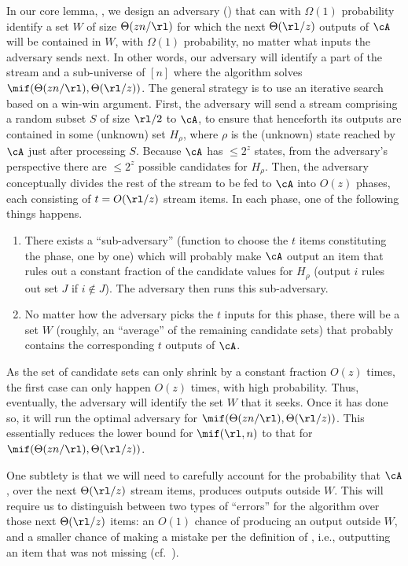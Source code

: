 \begin{itemize}
\begin{itemize}
In our core lemma, , we design an adversary
() that can with $\Omega(1)$ probability identify
a set $W$ of size $\Theta(z n /\rl)$ for which the next $\Theta(\rl/z)$
outputs of $\cA$ will be contained in $W$, with $\Omega(1)$ probability, no
matter what inputs the adversary sends next. In other words, our adversary
will identify a part of the stream and a sub-universe of $[n]$ where the
algorithm solves $\mif(\Theta(z n /\rl), \Theta(\rl/z))$. The general strategy
is to use an iterative search based on a win-win argument.  First, the
adversary will send a stream comprising a random subset $S$ of size $\rl/2$ to
$\cA$, to ensure that henceforth its outputs are contained in some (unknown)
set $H_\rho$, where $\rho$ is the (unknown) state reached by $\cA$ just after
processing $S$.  Because $\cA$ has $\le 2^z$ states, from the adversary's
perspective there are $\le 2^z$ possible candidates for $H_\rho$. Then, the
adversary conceptually divides the rest of the stream to be fed to $\cA$ into
$O(z)$ phases, each consisting of $t = O(\rl/z)$ stream items. In each phase,
one of the following things happens.
%
\begin{enumerate}
%
\item There exists a ``sub-adversary'' (function to choose the $t$ items
constituting the phase, one by one) which will probably make $\cA$ output an
item that rules out a constant fraction of the candidate values for $H_\rho$
(output $i$ rules out set $J$ if $i \notin J$). The adversary then runs this
sub-adversary.
%
\item No matter how the adversary picks the $t$ inputs for this phase, there
will be a set $W$ (roughly, an ``average'' of the remaining candidate sets)
that probably contains the corresponding $t$ outputs of $\cA$.
%
\end{enumerate}
%
As the set of candidate sets can only shrink by a constant fraction $O(z)$
times, the first case can only happen $O(z)$ times, with high probability.
Thus, eventually, the adversary will identify the set $W$ that it seeks. Once
it has done so, it will run the optimal adversary for $\mif(\Theta(z n /\rl),
\Theta(\rl/z))$.  This essentially reduces the lower bound for $\mif(\rl,n)$
to that for $\mif(\Theta(z n /\rl), \Theta(\rl/z))$.

One subtlety is that we will need to carefully account for the probability
that $\cA$, over the next $\Theta(\rl/z)$ stream items, produces outputs
outside $W$. This will require us to distinguish between two types of
``errors'' for the algorithm over those next $\Theta(\rl/z)$ items: an $O(1)$
chance of producing an output outside $W$, and a smaller chance of making a
mistake per the definition of \mif, i.e., outputting an item that was not
missing (cf.~).


\end{itemize}
\end{itemize}
